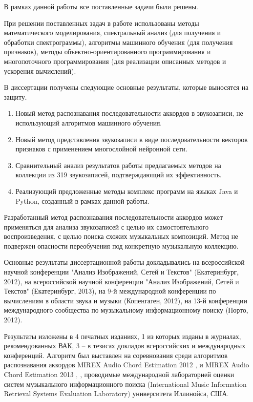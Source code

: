 В рамках данной работы все поставленные задачи были решены.

При решении поставленных задач в работе использованы методы математического
моделирования, спектральный анализ (для получения и обработки спектрограммы),
алгоритмы машинного обучения (для получения признаков), методы
объектно-ориентированного программирования и многопоточного программирования
(для реализации описанных методов и ускорения вычислений).

В диссертации получены следующие основные результаты, которые выносятся на
защиту.

\begin{enumerate}
  \item Новый метод распознавания последовательности аккордов в звукозаписи, не
  использующий алгоритмов машинного обучения.
  \item Новый метод представления звукозаписи в виде последовательности векторов
  признаков с применением многослойной нейронной сети.
  \item Сравнительный анализ результатов работы предлагаемых методов на
  коллекции из 319 звукозаписей, подтверждающий их эффективность.
  \item Реализующий предложенные методы комплекс программ на языках Java и
  Python, созданный в рамках данной работы.
\end{enumerate}

Разработанный метод распознавания последовательности аккордов может применяться
для анализа звукозаписей с целью их самостоятельного воспроизведения, с целью
поиска схожих музыкальных композиций. Метод не подвержен опасности переобучения
под конкретную музыкальную коллекцию.

Основные результаты диссертационной работы докладывались на всероссийской
научной конференции "Анализ Изображений, Сетей и Текстов" (Екатеринбург, 2012),
на всероссийской научной конференции "Анализ Изображений, Сетей и Текстов"
(Екатеринбург, 2013), на 9-й международной конференции по вычислениям в области
звука и музыки (Копенгаген, 2012), на 13-й конференции международного
сообщества по музыкальному информационному поиску (Порто, 2012).

Результаты изложены в 4 печатных изданиях, 1 из которых изданы в журналах,
рекомендованных ВАК, 3 -- в тезисах докладов всероссийских и международных
конференций. Алгоритм был выставлен на соревнования среди алгоритмов
распознавания аккордов MIREX Audio Chord Estimation 2012 \cite{ACEMrx2012},
\cite{ACEMcg2012} и MIREX Audio Chord Estimation 2013 \cite{ACEMrx2013},
\cite{ACEMcg2013}, проводимые международной лабораторией оценки систем
музыкального информационного поиска (International Music Information Retrieval
Systems Evaluation Laboratory) университета Иллинойса, США.

